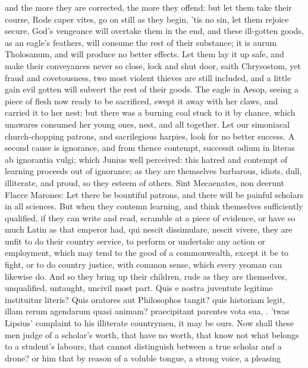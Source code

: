 {and the more they are corrected, the more they offend: but let them
take their course, Rode caper vites, go on still as they begin,
'tis no sin, let them rejoice secure, God's vengeance will overtake
them in the end, and these ill-gotten goods, as an eagle's feathers,
 will consume the rest of their substance; it is aurum
Tholosanum, and will produce no better effects. Let them lay it
up safe, and make their conveyances never so close, lock and shut door,
saith Chrysostom, yet fraud and covetousness, two most violent thieves
are still included, and a little gain evil gotten will subvert the rest
of their goods. The eagle in Aesop, seeing a piece of flesh now ready
to be sacrificed, swept it away with her claws, and carried it to her
nest; but there was a burning coal stuck to it by chance, which
unawares consumed her young ones, nest, and all together. Let our
simoniacal church-chopping patrons, and sacrilegious harpies, look for
no better success.
A second cause is ignorance, and from thence contempt, successit odium
in literas ab ignorantia vulgi; which Junius well perceived: this
hatred and contempt of learning proceeds out of ignorance; as
they are themselves barbarous, idiots, dull, illiterate, and proud, so
they esteem of others. Sint Mecaenates, non deerunt Flacce Marones: Let
there be bountiful patrons, and there will be painful scholars in all
sciences. But when they contemn learning, and think themselves
sufficiently qualified, if they can write and read, scramble at a piece
of evidence, or have so much Latin as that emperor had, qui
nescit dissimulare, nescit vivere, they are unfit to do their country
service, to perform or undertake any action or employment, which may
tend to the good of a commonwealth, except it be to fight, or to do
country justice, with common sense, which every yeoman can likewise do.
And so they bring up their children, rude as they are themselves,
unqualified, untaught, uncivil most part. Quis e nostra juventute
legitime instituitur literis? Quis oratores aut Philosophos tangit?
quis historiam legit, illam rerum agendarum quasi animam? praecipitant
parentes vota sua, \etc{}. 'twas Lipsius' complaint to his illiterate
countrymen, it may be ours. Now shall these men judge of a scholar's
worth, that have no worth, that know not what belongs to a student's
labours, that cannot distinguish between a true scholar and a drone? or
him that by reason of a voluble tongue, a strong voice, a pleasing
}
